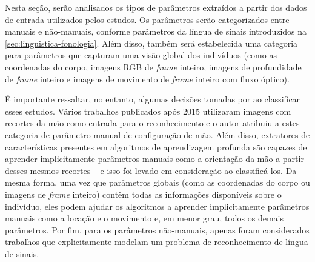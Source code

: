Nesta seção, serão analisados os tipos de parâmetros extraídos a partir dos dados de entrada utilizados pelos estudos. Os parâmetros serão categorizados entre manuais e não-manuais, conforme parâmetros da língua de sinais introduzidos na \autoref{sec:linguistica-fonologia}. Além disso, também será estabelecida uma categoria para parâmetros que capturam uma visão global dos indivíduos (como as coordenadas do corpo, imagens RGB de \textit{frame} inteiro, imagens de profundidade de \textit{frame} inteiro e imagens de movimento de \textit{frame} inteiro com fluxo óptico).

É importante ressaltar, no entanto, algumas decisões tomadas por  ao classificar esses estudos. Vários trabalhos publicados após 2015 utilizaram imagens com recortes da mão como entrada para o reconhecimento e o autor atribuiu a estes categoria de parâmetro manual de configuração de mão. Além disso, extratores de características presentes em algoritmos de aprendizagem profunda são capazes de aprender implicitamente parâmetros manuais como a orientação da mão a partir desses mesmos recortes -- e isso foi levado em consideração ao classificá-los. Da mesma forma, uma vez que parâmetros globais (como as coordenadas do corpo ou imagens de \textit{frame} inteiro) contêm todas as informações disponíveis sobre o indivíduo, eles podem ajudar os algoritmos a aprender implicitamente parâmetros manuais como a locação e o movimento e, em menor grau, todos os demais parâmetros. Por fim, para os parâmetros não-manuais, apenas foram considerados trabalhos que explicitamente modelam um problema de reconhecimento de língua de sinais.





